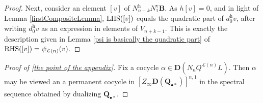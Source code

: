 \documentclass[11pt]{amsart} \renewcommand{\baselinestretch}{1.2}
\theoremstyle{plain}
\theoremstyle{definition}
\newcommand{\calL}{\mathcal{L}}
\newcommand{\EZ}[5]{[Z^{#1}_{#2}#3]^{#4}_{#5}}
\newcommand{\uver}{^\mathrm{v}}
\newcommand{\uhor}{^\mathrm{h}}
\newcommand{\dual}{\mathbf{D}}
\begin{document}
\begin{appendices}
\begin{proof}
Next, consider an element $[v]$ of $N\uhor_{n+k}N\uver_1\textbf{B}$. As $h[v]=0$, and in light of Lemma \ref{firstCompositeLemma}, $\textup{LHS}([v])$ equals the quadratic part of $d\uhor_0v$, after writing $d\uhor_0v$ as an expression in elements of $V_{n+k-1}$. This is exactly the description given in Lemma \ref{psi is basically the quadratic part} of $\textup{RHS}([v])=\psi_{\calL(n)}(v)$.
\end{proof}
\begin{proof}[Proof of \ref{the point of the appendix}]
Fix a cocycle $\alpha\in \dual(N_{n}Q^{\calL(n)} L)$. %
Then $\alpha$ may be viewed an a permanent cocycle in $\EZ{}{\infty}{\dual(\textbf{Q}_{\bullet*})}{n,1}{}$ in the spectral sequence obtained by dualizing $\textbf{Q}_{\bullet*}$. 


\end{proof}
\end{appendices}
\end{document}

